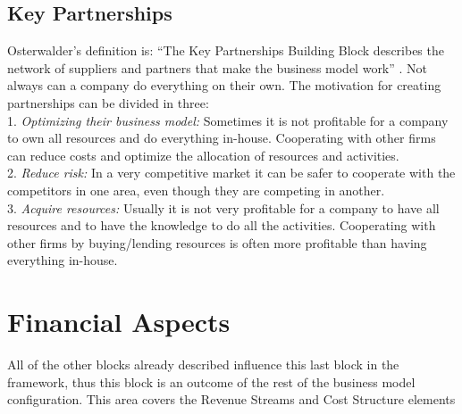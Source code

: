 \subsection{Key Partnerships}
Osterwalder’s definition is: “The Key Partnerships Building Block describes the network of suppliers and partners that make the business model work” \cite{osterwalder}. Not always can a company do everything on their own. The motivation for creating partnerships can be divided in three: 
\\
1. \emph{Optimizing their business model:} Sometimes it is not profitable for a company to own all resources and do everything in-house. Cooperating with other firms can reduce costs and optimize the allocation of resources and activities. 
\\
2. \emph{Reduce risk:} In a very competitive market it can be safer to cooperate with the competitors in one area, even though they are competing in another.
\\
3. \emph{Acquire resources:} Usually it is not very profitable for a company to have all resources and to have the knowledge to do all the activities. Cooperating with other firms by buying/lending resources is often more profitable than having everything in-house. \cite{osterwalder}

\section{Financial Aspects}
All of the other blocks already described influence this last block in the framework, thus this block is an outcome of the rest of the business model configuration. This area covers the Revenue Streams and Cost Structure elements \cite{osterwalderthesis}


